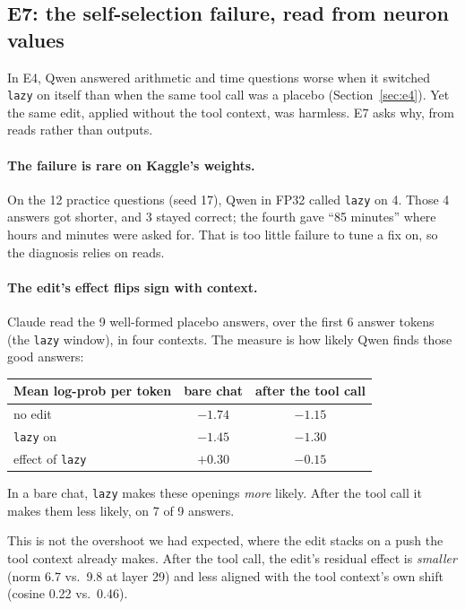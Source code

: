 \subsection{E7: the self-selection failure, read from neuron values}
\label{sec:e7}
In E4, Qwen answered arithmetic and time questions worse when it switched \texttt{lazy} on itself than when the same tool call was a placebo (Section~\ref{sec:e4}). Yet the same edit, applied without the tool context, was harmless. E7 asks why, from reads rather than outputs.

\paragraph{The failure is rare on Kaggle's weights.}
On the 12 practice questions (seed 17), Qwen in FP32 called \texttt{lazy} on 4. Those 4 answers got shorter, and 3 stayed correct; the fourth gave ``85 minutes'' where hours and minutes were asked for. That is too little failure to tune a fix on, so the diagnosis relies on reads.

\paragraph{The edit's effect flips sign with context.}
Claude read the 9 well-formed placebo answers, over the first 6 answer tokens (the \texttt{lazy} window), in four contexts. The measure is how likely Qwen finds those good answers:

\begin{center}\small
\begin{tabular}{lcc}\toprule
Mean log-prob per token & bare chat & after the tool call\\\midrule
no edit & $-1.74$ & $-1.15$\\
\texttt{lazy} on & $-1.45$ & $-1.30$\\
effect of \texttt{lazy} & $+0.30$ & $-0.15$\\\bottomrule
\end{tabular}
\end{center}

In a bare chat, \texttt{lazy} makes these openings \emph{more} likely. After the tool call it makes them less likely, on 7 of 9 answers.

This is not the overshoot we had expected, where the edit stacks on a push the tool context already makes. After the tool call, the edit's residual effect is \emph{smaller} (norm 6.7 vs.\ 9.8 at layer 29) and less aligned with the tool context's own shift (cosine 0.22 vs.\ 0.46).

